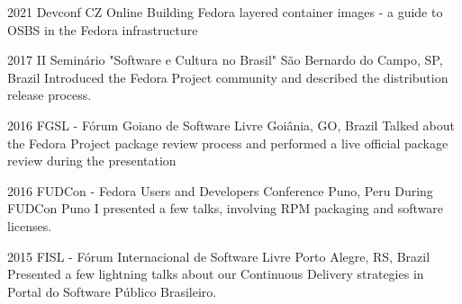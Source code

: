 \documentclass[print]{friggeri-cv}
\begin{document}
\begin{entrylist}


\entry
{2021}
{Devconf CZ}
{Online}
{Building Fedora layered container images - a guide to OSBS in the Fedora infrastructure}


\entry
{2017}
{II Seminário "Software e Cultura no Brasil"}
{São Bernardo do Campo, SP, Brazil}
{Introduced the Fedora Project community and described the distribution release process.}


\entry
{2016}
{FGSL - Fórum Goiano de Software Livre}
{Goiânia, GO, Brazil}
{Talked about the Fedora Project package review process and performed a live official package review during the presentation}

\entry
{2016}
{FUDCon - Fedora Users and Developers Conference}
{Puno, Peru}
{During FUDCon Puno I presented a few talks, involving RPM packaging and software licenses.}


\entry
{2015}
{FISL - Fórum Internacional de Software Livre}
{Porto Alegre, RS, Brazil}
{Presented a few lightning talks about our Continuous Delivery strategies in
  Portal do Software Público Brasileiro.}


\end{entrylist}






\end{document}
